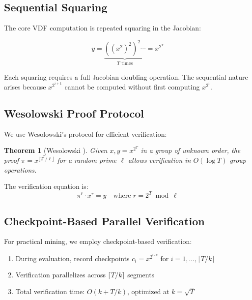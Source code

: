 \documentclass[11pt,a4paper]{article}
\newtheorem{theorem}{Theorem}
\begin{document}
\subsection{Sequential Squaring}

The core VDF computation is repeated squaring in the Jacobian:

\begin{equation}
y = \underbrace{((x^2)^2)^2 \cdots}_{T \text{ times}} = x^{2^T}
\end{equation}

Each squaring requires a full Jacobian doubling operation. The sequential nature arises because $x^{2^{i+1}}$ cannot be computed without first computing $x^{2^i}$.

\subsection{Wesolowski Proof Protocol}

We use Wesolowski's protocol for efficient verification:

\begin{theorem}[Wesolowski \cite{wesolowski2019}]
Given $x, y = x^{2^T}$ in a group of unknown order, the proof $\pi = x^{\lfloor 2^T / \ell \rfloor}$ for a random prime $\ell$ allows verification in $O(\log T)$ group operations.
\end{theorem}

The verification equation is:
\begin{equation}
\pi^\ell \cdot x^r = y \quad \text{where } r = 2^T \bmod \ell
\end{equation}

\subsection{Checkpoint-Based Parallel Verification}

For practical mining, we employ checkpoint-based verification:

\begin{enumerate}
    \item During evaluation, record checkpoints $c_i = x^{2^{i \cdot k}}$ for $i = 1, \ldots, \lceil T/k \rceil$
    \item Verification parallelizes across $\lceil T/k \rceil$ segments
    \item Total verification time: $O(k + T/k)$, optimized at $k = \sqrt{T}$
\end{enumerate}
\end{document}
